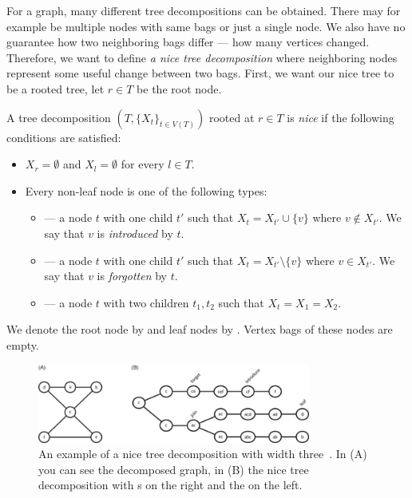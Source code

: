 For a graph, many different tree decompositions can be obtained.
There may for example be multiple nodes with same bags or just a single node.
We also have no guarantee how two neighboring bags differ --- how many vertices changed.
Therefore, we want to define \emph{a nice tree decomposition} where neighboring nodes
represent some useful change between two bags.
First, we want our nice tree to be a rooted tree,
let \( r \in T \) be the root node.
%
\begin{definition}
	A tree decomposition
	\( (T, {\{X_t\}}_{t \in V ( T )}) \) rooted at \( r \in T \)
	is \emph{nice} if the following conditions are satisfied:
	\begin{itemize}
		\item \( X_r = \emptyset \) and \( X_l = \emptyset \) for every \LeafNode{} \( l \in T \).
		\item Every non-leaf node is one of the following types:
		      \begin{itemize}
			      \item \IntroduceVertexNode{} --- a node \( t \) with one child \( t' \)
			            such that \( X_t = X_{t'} \cup \{v\} \) where \( v \not\in X_{t'} \).
			            We say that \( v \) is \emph{introduced} by \( t \).
			      \item \ForgetVertexNode{} --- a node \( t \) with one child \( t' \)
			            such that \( X_t = X_{t'} \setminus \{v\} \) where \( v \in X_{t'} \).
			            We say that \( v \) is \emph{forgotten} by \( t \).
			      \item \JoinNode --- a node \( t \) with two children \( t_1, t_2 \)
			            such that \( X_t = X_1 = X_2 \).
		      \end{itemize}
	\end{itemize}
	We denote the root node by \RootNode{} and leaf nodes by \LeafNode{}.
	Vertex bags of these nodes are empty.
\end{definition}
%
\begin{figure}[ht]
	\begin{center}
		\includegraphics[width=0.80\textwidth]{./assets/nice_tree_decomposition.png}
	\end{center}
	\caption[Nice tree decomposition]{An example of a nice tree decomposition with width three~\cite{nice_tree_decomposition_img}.
		In (A) you can see the decomposed graph, in (B) the nice tree decomposition
		with \LeafNode{}s on the right and the \RootNode{} on the left.
	}%
\end{figure}

